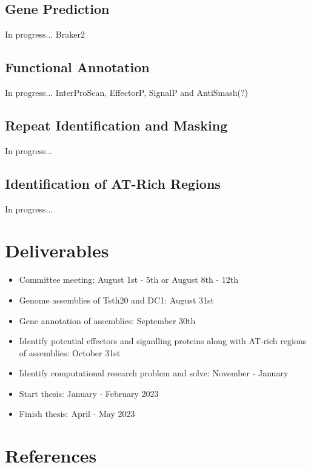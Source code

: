\documentclass[12pt]{article}
\begin{document}
\subsection{Gene Prediction}
In progress... Braker2

\subsection{Functional Annotation}
In progress... InterProScan, EffectorP, SignalP and AntiSmash(?)

\subsection{Repeat Identification and Masking}
In progress...

\subsection{Identification of AT-Rich Regions}
In progress...

\section{Deliverables}

\begin{itemize}
  \item Committee meeting: August 1st - 5th or August 8th - 12th
  \item Genome assemblies of Tsth20 and DC1: August 31st
  \item Gene annotation of assemblies: September 30th
  \item Identify potential effectors and siganlling proteins along with AT-rich regions of assemblies: October 31st
  \item Identify computational research problem and solve: November - January
  \item Start thesis: January - February 2023
  \item Finish thesis: April - May 2023
\end{itemize}

\section{References}
\end{document}

